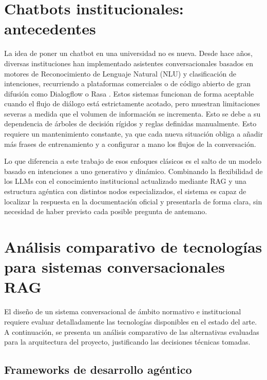 \documentclass[12pt,a4paper,oneside]{report}
\begin{document}
\section{Chatbots institucionales: antecedentes}

La idea de poner un chatbot en una universidad no es nueva. Desde hace años, diversas instituciones han implementado asistentes conversacionales basados en motores de Reconocimiento de Lenguaje Natural (NLU) y clasificación de intenciones, recurriendo a plataformas comerciales o de código abierto de gran difusión como Dialogflow \cite{dialogflow_ref} o Rasa \cite{rasa_ref}. Estos sistemas funcionan de forma aceptable cuando el flujo de diálogo está estrictamente acotado, pero muestran limitaciones severas a medida que el volumen de información se incrementa. Esto se debe a su dependencia de árboles de decisión rígidos y reglas definidas manualmente. Esto requiere un mantenimiento constante, ya que cada nueva situación obliga a añadir más frases de entrenamiento y a configurar a mano los flujos de la conversación.

Lo que diferencia a este trabajo de esos enfoques clásicos es el salto de un modelo basado en intenciones a uno generativo y dinámico. Combinando la flexibilidad de los LLMs con el conocimiento institucional actualizado mediante RAG y una estructura agéntica con distintos nodos especializados, el sistema es capaz de localizar la respuesta en la documentación oficial y presentarla de forma clara, sin necesidad de haber previsto cada posible pregunta de antemano.

\section{Análisis comparativo de tecnologías para sistemas conversacionales RAG}

El diseño de un sistema conversacional de ámbito normativo e institucional requiere evaluar detalladamente las tecnologías disponibles en el estado del arte. A continuación, se presenta un análisis comparativo de las alternativas evaluadas para la arquitectura del proyecto, justificando las decisiones técnicas tomadas.

\subsection*{Frameworks de desarrollo agéntico}
\end{document}

